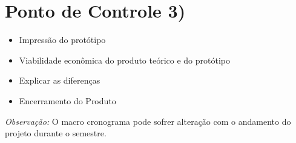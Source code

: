 \section*{Ponto de Controle 3)}
\begin{itemize}
\item Impressão do protótipo
\item Viabilidade econômica do produto teórico e do protótipo
\item Explicar as diferenças
\item Encerramento do Produto
\end{itemize}

\noindent\textit{Observação:} O macro cronograma pode sofrer alteração com o andamento do projeto durante o semestre.